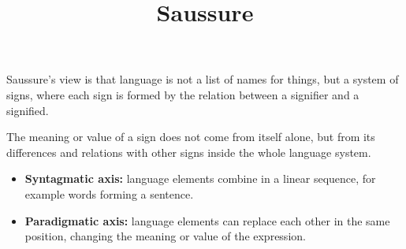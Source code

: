 \documentclass[a4paper]{article}
\title{Saussure}
\date{}
\begin{document}
    \maketitle
    
    Saussure’s view \cite{saussure-1966-course-in-general-linguistics} is that language is not a list of names for things, but a system of signs, where each sign is formed by the relation between a signifier and a signified.
    
    The meaning or value of a sign does not come from itself alone, but from its differences and relations with other signs inside the whole language system.
    
    \begin{itemize}
        \item \textbf{Syntagmatic axis:} language elements combine in a linear sequence, for example words forming a sentence.
        \item \textbf{Paradigmatic axis:} language elements can replace each other in the same position, changing the meaning or value of the expression.
    \end{itemize}
    
    
    
\end{document}
